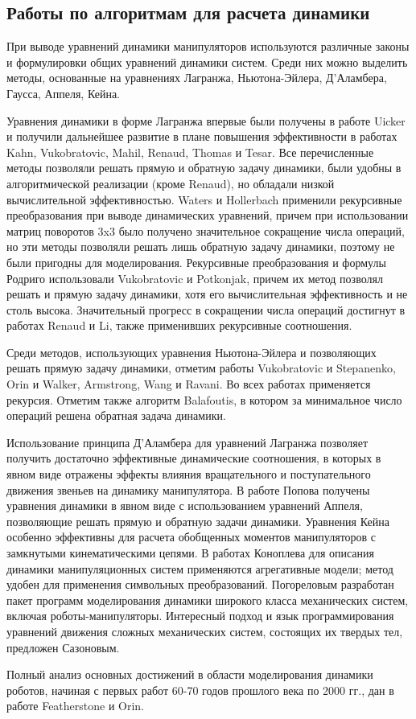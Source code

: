 \subsection{Работы по алгоритмам для расчета динамики}

При выводе уравнений динамики манипуляторов используются различные законы и формулировки общих уравнений динамики систем. Среди них можно выделить методы, основанные на уравнениях Лагранжа, Ньютона-Эйлера, Д'Аламбера, Гаусса, Аппеля, Кейна.

Уравнения динамики в форме Лагранжа впервые были получены в работе Uicker и получили дальнейшее развитие в плане повышения эффективности в работах Kahn, Vukobratovic, Mahil, Renaud, Thomas и Tesar. Все перечисленные методы позволяли решать прямую и обратную задачу динамики, были удобны в алгоритмической реализации (кроме Renaud), но обладали низкой вычислительной эффективностью. Waters и Hollerbach применили рекурсивные преобразования при выводе динамических уравнений, причем при использовании матриц поворотов 3x3 было получено значительное сокращение числа операций, но эти методы позволяли решать лишь обратную задачу динамики, поэтому не были пригодны для моделирования. Рекурсивные преобразования и формулы Родриго использовали Vukobratovic и Potkonjak, причем их метод позволял решать и прямую задачу динамики, хотя его вычислительная эффективность и не столь высока. Значительный прогресс в сокращении числа операций достигнут в работах Renaud и Li, также применивших рекурсивные соотношения.

Среди методов, использующих уравнения Ньютона-Эйлера и позволяющих решать прямую задачу динамики, отметим работы Vukobratovic и Stepanenko, Orin и Walker, Armstrong, Wang и Ravani. Во всех работах применяется рекурсия. Отметим также алгоритм Balafoutis, в котором за минимальное число операций решена обратная задача динамики.

Использование принципа Д'Аламбера для уравнений Лагранжа позволяет получить достаточно эффективные динамические соотношения, в которых в явном виде отражены эффекты влияния вращательного и поступательного движения звеньев на динамику манипулятора. В работе Попова получены уравнения динамики в явном виде с использованием уравнений Аппеля, позволяющие решать прямую и обратную задачи динамики. Уравнения Кейна особенно эффективны для расчета обобщенных моментов манипуляторов с замкнутыми кинематическими цепями. В работах Коноплева для описания динамики манипуляционных систем применяются агрегативные модели; метод удобен для применения символьных преобразований. Погореловым разработан пакет программ моделирования динамики широкого класса механических систем, включая роботы-манипуляторы. Интересный подход и язык программирования уравнений движения сложных механических систем, состоящих их твердых тел, предложен Сазоновым.

Полный анализ основных достижений в области моделирования динамики роботов, начиная с первых работ 60-70 годов прошлого века по 2000 гг., дан в работе Featherstone и Orin.

